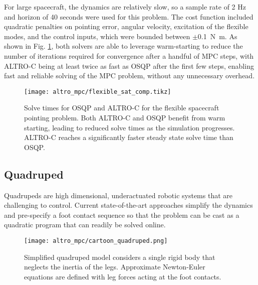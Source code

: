 \documentclass[../root.tex]{subfiles}
\begin{document}

For large spacecraft, the dynamics are relatively slow, so a sample rate of 2
Hz and horizon of 40 seconds were used for this problem. The cost function
included quadratic penalties on pointing error, angular velocity, excitation
of the flexible modes, and the control inputs, which were bounded between
$\pm$\SI{0.1}{\N\m}. As shown in Fig. \ref{fig:flex_sat}, both solvers are
able to leverage warm-starting to reduce the number of iterations required
for convergence after a handful of MPC steps, with ALTRO-C being at least
twice as fast as OSQP after the first few steps, enabling fast
and reliable solving of the MPC problem, without any unnecessary overhead.

\begin{figure}
    \centering
    \texttt{[image: altro\_mpc/flexible\_sat\_comp.tikz]}
    \caption{Solve times for OSQP and ALTRO-C for the flexible spacecraft
    pointing problem. Both ALTRO-C and OSQP benefit from warm starting,
    leading to reduced solve times as the simulation progresses. ALTRO-C
    reaches a significantly faster steady state solve time than OSQP.}
    \label{fig:flex_sat}
\end{figure}
    

\subsection{Quadruped}
Quadrupeds are high dimensional, underactuated robotic systems that are
challenging to control.
Current state-of-the-art approaches simplify the dynamics and pre-specify a
foot contact sequence so that the problem can be cast as a quadratic program
that can readily be solved online.
\begin{figure}
    \centering
    \texttt{[image: altro\_mpc/cartoon\_quadruped.png]}
    \caption{Simplified quadruped model considers a single rigid body that neglects the inertia of the legs. Approximate Newton-Euler equations are defined with leg forces acting at the foot contacts.}
    \label{fig:quad_cartoon}
\end{figure}
\end{document}
